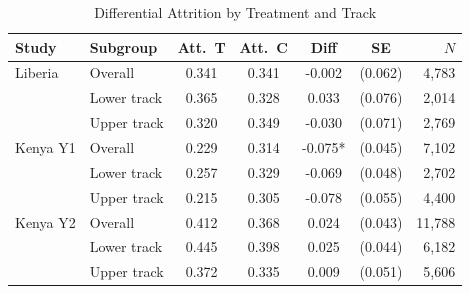\begin{table}[htbp]
\centering\small
\caption{Differential Attrition by Treatment and Track}
\label{tab:attrition}
\begin{tabular}{llccccr}
\toprule
Study & Subgroup & Att.\ T & Att.\ C & Diff & SE & $N$ \\
\midrule
Liberia & Overall & 0.341 & 0.341 & -0.002 & (0.062) & 4,783 \\
 & Lower track & 0.365 & 0.328 & 0.033 & (0.076) & 2,014 \\
 & Upper track & 0.320 & 0.349 & -0.030 & (0.071) & 2,769 \\
\addlinespace
Kenya Y1 & Overall & 0.229 & 0.314 & -0.075* & (0.045) & 7,102 \\
 & Lower track & 0.257 & 0.329 & -0.069 & (0.048) & 2,702 \\
 & Upper track & 0.215 & 0.305 & -0.078 & (0.055) & 4,400 \\
\addlinespace
Kenya Y2 & Overall & 0.412 & 0.368 & 0.024 & (0.043) & 11,788 \\
 & Lower track & 0.445 & 0.398 & 0.025 & (0.044) & 6,182 \\
 & Upper track & 0.372 & 0.335 & 0.009 & (0.051) & 5,606 \\
\bottomrule
\end{tabular}
\par\smallskip{}
\end{table}